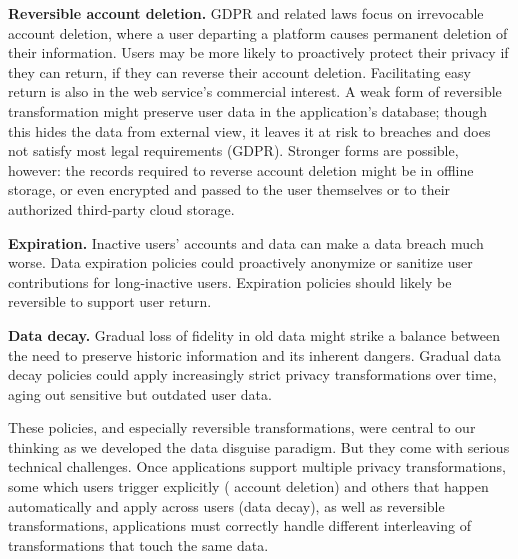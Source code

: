 \textbf{Reversible account deletion.}
%
GDPR and related laws focus on irrevocable account deletion, where
a user departing a platform causes permanent deletion of their information.
%
Users may be more likely to proactively protect their privacy if they
can return, \ie if they can reverse their account deletion.
%
Facilitating easy return is also in the web service's commercial interest.
%
A weak form of reversible transformation might preserve user data in the
application's database; though this hides the data from external view,
it leaves it at risk to breaches and does not satisfy most legal requirements
(\eg GDPR).
%
Stronger forms are possible, however: the records required to reverse account
deletion might be in offline storage, or even encrypted and passed to the
user themselves or to their authorized third-party cloud storage.
%


\textbf{Expiration.}
%
Inactive users' accounts and data can make a data breach much worse.
%
Data expiration policies could proactively anonymize or sanitize user
contributions for long-inactive users.
%
Expiration policies should likely be reversible to support user return.
%

\textbf{Data decay.}
%
Gradual loss of fidelity in old data might strike a balance between the need
to preserve historic information and its inherent dangers.
%
Gradual data decay policies could apply increasingly strict privacy
transformations over time, aging out sensitive but outdated user data.
%

%
These policies, and especially reversible transformations, were central to our
thinking as we developed the data disguise paradigm.
%
But they come with serious technical challenges. Once applications support
multiple privacy trans\-form\-ations, some which users trigger explicitly (\eg
account deletion) and others that happen automatically and apply across users
(\eg data decay), as well as reversible transformations, applications must correctly
handle different interleaving of transformations that touch the same data.
%


